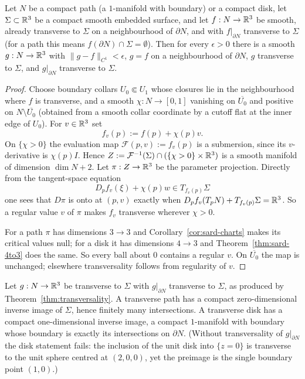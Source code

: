 \begin{theorem}
\label{thm:transversality}
Let $N$ be a compact path (a $1$-manifold with boundary) or a compact disk,
let $\Sigma\subset\mathbb R^3$ be a compact smooth embedded surface, and let
$f:N\to\mathbb R^3$ be smooth, already transverse to $\Sigma$ on a neighbourhood
of $\partial N$, and with $f|_{\partial N}$ transverse to $\Sigma$ (for a path
this means $f(\partial N)\cap\Sigma=\emptyset$).  Then for every $\epsilon>0$
there is a smooth $g:N\to\mathbb R^3$ with $\|g-f\|_{C^1}<\epsilon$, $g=f$ on a
neighbourhood of $\partial N$, $g$ transverse to $\Sigma$, and $g|_{\partial N}$
transverse to $\Sigma$.
\end{theorem}

\begin{proof}
Choose boundary collars $U_0\Subset U_1$ whose closures lie in the
neighbourhood where $f$ is transverse, and a smooth $\chi:N\to[0,1]$ vanishing
on $\overline{U_0}$ and positive on $N\setminus\overline{U_0}$ (obtained from a
smooth collar coordinate by a cutoff flat at the inner edge of $U_0$).  For
$v\in\mathbb R^3$ set
\begin{equation}\label{eq:transv-family}
  f_v(p):=f(p)+\chi(p)v .
\end{equation}
On $\{\chi>0\}$ the evaluation map $\mathcal F(p,v):=f_v(p)$ is a submersion,
since its $v$-derivative is $\chi(p)I$.  Hence
$Z:=\mathcal F^{-1}(\Sigma)\cap(\{\chi>0\}\times\mathbb R^3)$ is a smooth manifold of
dimension $\dim N+2$.  Let $\pi:Z\to\mathbb R^3$ be the parameter projection.
Directly from the tangent-space equation
\begin{equation}\label{eq:transv-tangent}
  D_pf_v(\xi)+\chi(p)w\in T_{f_v(p)}\Sigma
\end{equation}
one sees that $D\pi$ is onto at $(p,v)$ exactly when
$D_pf_v(T_pN)+T_{f_v(p)}\Sigma=\mathbb R^3$.  So a regular value $v$ of $\pi$ makes
$f_v$ transverse wherever $\chi>0$.

For a path $\pi$ has dimensions $3\to3$ and
Corollary~\ref{cor:sard-charts} makes its critical values null; for a disk it
has dimensions $4\to3$ and Theorem~\ref{thm:sard-4to3} does the same.  So every
ball about $0$ contains a regular $v$.  On $\overline{U_0}$ the map is
unchanged; elsewhere transversality follows from regularity of $v$.
\end{proof}

\begin{corollary}\label{cor:transv-preimage}
Let $g:N\to\mathbb R^3$ be transverse to $\Sigma$ with $g|_{\partial N}$ transverse
to $\Sigma$, as produced by Theorem~\ref{thm:transversality}.  A transverse
path has a compact zero-dimensional inverse image of $\Sigma$, hence finitely
many intersections.  A transverse disk has a compact one-dimensional inverse
image, a compact $1$-manifold with boundary whose boundary is exactly its
intersections on $\partial N$.  (Without transversality of $g|_{\partial N}$
the disk statement fails: the inclusion of the unit disk into $\{z=0\}$ is
transverse to the unit sphere centred at $(2,0,0)$, yet the preimage is the
single boundary point $(1,0)$.)
\end{corollary}

